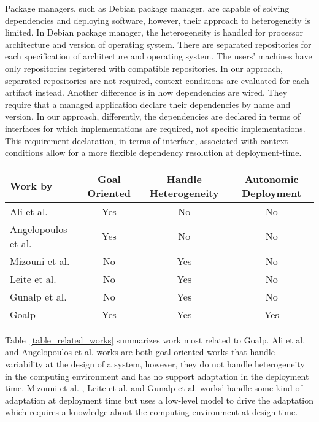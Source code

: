 Package managers, such as Debian package manager\cite{aoki_debian_2016}, are capable of solving dependencies and deploying software, however, their approach to heterogeneity is limited. In Debian package manager, the heterogeneity is handled for processor architecture and version of operating system. There are separated repositories for each specification of architecture and operating system. The users' machines have only repositories registered with compatible repositories.
In our approach, separated repositories are not required, context conditions are evaluated for each artifact instead.
Another difference is in how dependencies are wired. They require that a managed application declare their dependencies by name and version. In our approach, differently, the dependencies are declared in terms of interfaces for which implementations are required, not specific implementations.
This requirement declaration, in terms of interface, associated with context conditions allow for a more flexible dependency resolution at deployment-time.

\begin{table*}[!ht]
\centering
\caption{Comparing characteristic properties of selected approaches related to Goalp}
\label{table_related_works}
\begin{tabular}{p{4cm} ccc}
\toprule
Work by &
   Goal Oriented &
    Handle Heterogeneity &
    Autonomic Deployment \\
\midrule
Ali et al.\citep{ali_requirements-driven_2014} & \cellcolor{blue!10} Yes & No & No \\
Angelopoulos et al. \cite{angelopoulos_capturing_2015} & \cellcolor{blue!10}Yes & No & No \\
Mizouni et al. \citep{mizouni_framework_2014} & No & \cellcolor{blue!10} Yes & No \\
Leite et al. \citep{ferreira_leite_user_2014}  & No & \cellcolor{blue!10} Yes & No \\
Gunalp et al.\citep{gunalp_rondo_2015} & No & \cellcolor{blue!10} Yes  &  No\\
Goalp & \cellcolor{blue!10} Yes & \cellcolor{blue!10} Yes & \cellcolor{blue!10} Yes \\
\bottomrule
\end{tabular}
\end{table*}

Table~\ref{table_related_works} summarizes work most related to Goalp. Ali et al.\citep{ali_requirements-driven_2014} and Angelopoulos et al. \cite{angelopoulos_capturing_2015} works are both goal-oriented works that handle variability at the design of a system, however, they do not handle heterogeneity in the computing environment and has no support adaptation in the deployment time. Mizouni et al. \citep{mizouni_framework_2014}, Leite et al. \citep{ferreira_leite_user_2014} and Gunalp et al.\citep{gunalp_rondo_2015} works' handle some kind of adaptation at deployment time but uses a low-level model to drive the adaptation which requires a knowledge about the computing environment at design-time.


